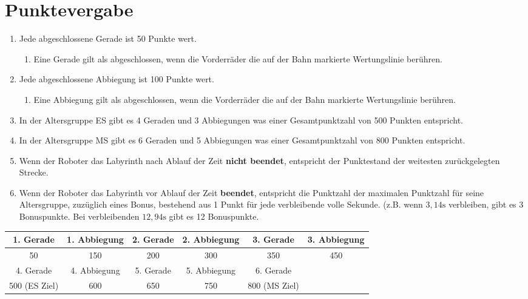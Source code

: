 \documentclass[a4paper,12pt]{article}
\begin{document}
\section{Punktevergabe}
\begin{enumerate}
	\item Jede abgeschlossene Gerade ist 50 Punkte wert.
	\begin{enumerate}
		\item Eine Gerade gilt als abgeschlossen, wenn die Vorderräder
			die auf der Bahn markierte Wertungslinie berühren.
	\end{enumerate}
	\item Jede abgeschlossene Abbiegung ist 100 Punkte wert.
	\begin{enumerate}
		\item Eine Abbiegung gilt als abgeschlossen, wenn die
			Vorderräder die auf der Bahn markierte Wertungslinie
			berühren.
	\end{enumerate}
	\item In der Altersgruppe ES gibt es 4 Geraden und 3 Abbiegungen was
		einer Gesamtpunktzahl von 500 Punkten entspricht.
	\item In der Altersgruppe MS gibt es 6 Geraden und 5 Abbiegungen was
		einer Gesamtpunktzahl von 800 Punkten entspricht.
	\item Wenn der Roboter das Labyrinth nach Ablauf der Zeit \textbf{nicht
		beendet}, entspricht der Punktestand der weitesten
		zurückgelegten Strecke.
	\item Wenn der Roboter das Labyrinth vor Ablauf der Zeit
		\textbf{beendet}, entspricht die Punktzahl der maximalen
		Punktzahl für seine Altersgruppe, zuzüglich eines Bonus,
		bestehend aus 1 Punkt für jede verbleibende volle Sekunde.
		(z.B. wenn $3{,}14\mathrm{s}$ verbleiben, gibt es 3 Bonuspunkte.
		Bei verbleibenden $12{,}94\mathrm{s}$ gibt es 12 Bonuspunkte.
\end{enumerate}
\begin{center}
	\begin{tabular}{|c|c|c|c|c|c|} \hline
		\rowcolor{Gray}
		1. Gerade & 1. Abbiegung & 2. Gerade & 2. Abbiegung & 3. Gerade & 3. Abbiegung  \\ \hline
		50 & 150 & 200 & 300 & 350 & 450  \\ \hline
		\rowcolor{Gray}
		4. Gerade & 4. Abbiegung & 5. Gerade & 5. Abbiegung & 6. Gerade & \\ \hline
		500 (ES Ziel) & 600 & 650 & 750 & 800 (MS Ziel) & \\ \hline
	\end{tabular}
\end{center}
\end{document}
